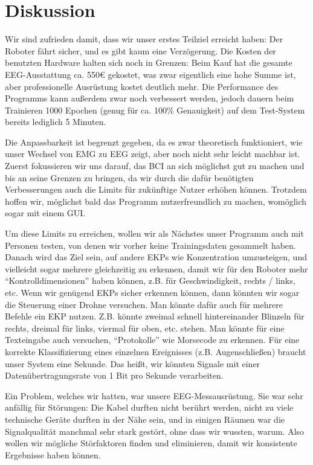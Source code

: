 \documentclass[11pt]{scrartcl}
\begin{document}
	\section{Diskussion}

	Wir sind zufrieden damit, dass wir unser erstes Teilziel erreicht haben: Der Roboter fährt sicher, und es gibt kaum eine Verzögerung. Die Kosten der benutzten Hardware halten sich noch in Grenzen: Beim Kauf hat die gesamte EEG-Ausstattung ca. 550€ gekostet, was zwar eigentlich eine hohe Summe ist, aber professionelle Ausrüstung kostet deutlich mehr. Die Performance des Programms kann außerdem zwar noch verbessert werden, jedoch dauern beim Trainieren 1000 Epochen (genug für ca. 100\% Genauigkeit) auf dem Test-System bereits lediglich 5 Minuten.

	Die Anpassbarkeit ist begrenzt gegeben, da es zwar theoretisch funktioniert, wie unser Wechsel von EMG zu EEG zeigt, aber noch nicht sehr leicht machbar ist. Zuerst fokussieren wir uns darauf, das BCI an sich möglichst gut zu machen und bis an seine Grenzen zu bringen, da wir durch die dafür benötigten Verbesserungen auch die Limits für zukünftige Nutzer erhöhen können. Trotzdem hoffen wir, möglichst bald das Programm nutzerfreundlich zu machen, womöglich sogar mit einem GUI.

	Um diese Limits zu erreichen, wollen wir als Nächstes unser Programm auch mit Personen testen, von denen wir vorher keine Trainingsdaten gesammelt haben.
%
	Danach wird das Ziel sein, auf andere EKPs wie Konzentration umzusteigen, und vielleicht sogar mehrere gleichzeitig zu erkennen, damit wir für den Roboter mehr \enquote{Kontrolldimensionen} haben können, z.B. für Geschwindigkeit, rechts / links, etc. Wenn wir genügend EKPs sicher erkennen können, dann könnten wir sogar die Steuerung einer Drohne versuchen. Man könnte dafür auch für mehrere Befehle ein EKP nutzen. Z.B. könnte zweimal schnell hintereinander Blinzeln für rechts, dreimal für links, viermal für oben, etc. stehen. Man könnte für eine Texteingabe auch versuchen, \enquote{Protokolle} wie Morsecode zu erkennen. Für eine korrekte Klassifizierung eines einzelnen Ereignisses (z.B. Augenschließen) braucht unser System eine Sekunde. Das heißt, wir könnten Signale mit einer Datenübertragungsrate von 1 Bit pro Sekunde verarbeiten.

	Ein Problem, welches wir hatten, war unsere EEG-Messausrüstung. Sie war sehr anfällig für Störungen: Die Kabel durften nicht berührt werden, nicht zu viele technische Geräte durften in der Nähe sein, und in einigen Räumen war die Signalqualität manchmal sehr stark gestört, ohne dass wir wussten, warum. Also wollen wir mögliche Störfaktoren finden und eliminieren, damit wir konsistente Ergebnisse haben können.
\end{document}
